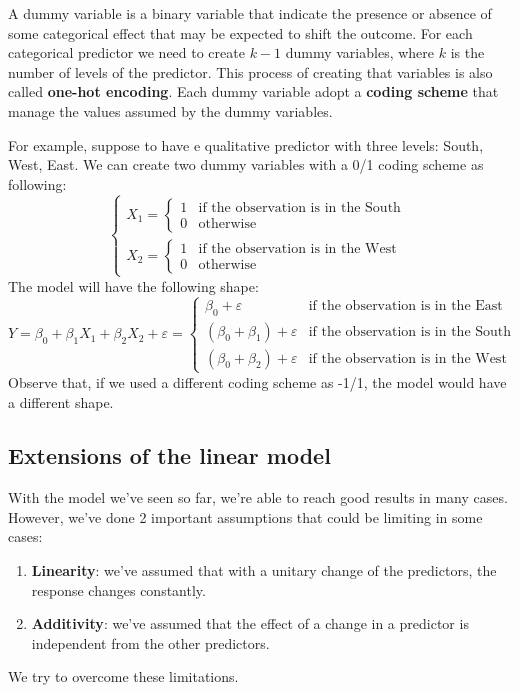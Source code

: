 A dummy variable is a binary variable that indicate the presence or absence of some categorical effect that may be expected to shift the outcome. For each categorical predictor we need to create $k-1$ dummy variables, where $k$ is the number of levels of the predictor. This process of creating that variables is also called \textbf{one-hot encoding}.
Each dummy variable adopt a \textbf{coding scheme} that manage the values assumed by the dummy variables.

For example, suppose to have e qualitative predictor with three levels: South, West, East. We can create two dummy variables with a 0/1 coding scheme as following:
\[
    \begin{cases}
        X_1 =
        \begin{cases}
            1 & \text{if the observation is in the South} \\
            0 & \text{otherwise}
        \end{cases} \\
        X_2 =
        \begin{cases}
            1 & \text{if the observation is in the West} \\
            0 & \text{otherwise}
        \end{cases}
    \end{cases}
\]
The model will have the following shape:
\[
    Y = \beta_0 + \beta_1 X_1 + \beta_2 X_2 + \varepsilon  =
    \begin{cases}
        \beta_0 + \varepsilon             & \text{if the observation is in the East}  \\
        (\beta_0 + \beta_1) + \varepsilon & \text{if the observation is in the South} \\
        (\beta_0 + \beta_2) + \varepsilon & \text{if the observation is in the West}
    \end{cases}
\]
Observe that, if we used a different coding scheme as -1/1, the model would have a different shape.
\subsection*{Extensions of the linear model}
With the model we've seen so far, we're able to reach good results in many cases. However, we've done 2 important assumptions that could be limiting in some cases:
\begin{enumerate}
    \item \textbf{Linearity}: we've assumed that with a unitary change of the predictors, the response changes constantly.
    \item \textbf{Additivity}: we've assumed that the effect of a change in a predictor is independent from the other predictors.
\end{enumerate}
We try to overcome these limitations.
